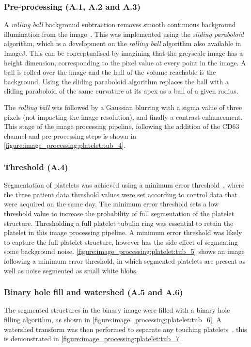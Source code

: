 \subsubsection{Pre-processing (A.1, A.2 and A.3)}
A \emph{rolling ball} background subtraction removes smooth continuous background illumination from the image~\cite{Sternberg1983}. This was implemented using the \emph{sliding paraboloid} algorithm, which is a development on the \emph{rolling ball} algorithm also available in ImageJ. This can be conceptualised by imagining that the greyscale image has a height dimension, corresponding to the pixel value at every point in the image. A ball is rolled over the image and the hull of the volume reachable is the background. Using the sliding paraboloid algorithm replaces the ball with a sliding paraboloid of the same curvature at its apex as a ball of a given radius.

The \emph{rolling ball} was followed by a Gaussian blurring with a sigma value of three pixels (not impacting the image resolution), and finally a contrast enhancement. This stage of the image processing pipeline, following the addition of the CD63 channel and pre-processing steps is shown in \autoref{figure:image_processing:platelet:tub_4}.

\subsubsection{Threshold (A.4)}
Segmentation of platelets was achieved using a minimum error threshold~\cite{Kittler1986}, where the three patient data threshold values were set according to control data that were acquired on the same day. The minimum error threshold sets a low threshold value to increase the probability of full segmentation of the platelet structure. Thresholding a full platelet tubulin ring was essential to retain the platelet in this image processing pipeline. A minimum error threshold was likely to capture the full platelet structure, however has the side effect of segmenting some background noise. \autoref{figure:image_processing:platelet:tub_5} shows an image following a minimum error threshold, in which segmented platelets are present as well as noise segmented as small white blobs.

\subsubsection{Binary hole fill and watershed (A.5 and A.6)}
The segmented structures in the binary image were filled with a binary hole filling algorithm, as shown in \autoref{figure:image_processing:platelet:tub_6}. A watershed transform was then performed to separate any touching platelets~\cite{Vincent1991}, this is demonstrated in \autoref{figure:image_processing:platelet:tub_7}.


